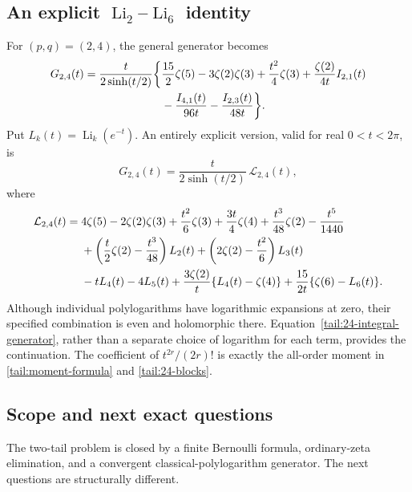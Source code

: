 \subsection{An explicit \texorpdfstring{$\operatorname{Li}_2$--$\operatorname{Li}_6$}{Li2--Li6} identity}

For \((p,q)=(2,4)\), the general generator becomes
\begin{align}\label{tail:24-integral-generator}
 G_{2,4}(t)=\frac{t}{2\sinh(t/2)}\bigg\{
 &\frac{15}{2}\zeta(5)-3\zeta(2)\zeta(3)
       +\frac{t^2}{4}\zeta(3)
       +\frac{\zeta(2)}{4t}I_{2,1}(t)\notag\\
 &-\frac{I_{4,1}(t)}{96t}
       -\frac{I_{2,3}(t)}{48t}\bigg\}.
\end{align}
Put \(L_k(t)=\operatorname{Li}_k(e^{-t})\). An entirely explicit
version, valid for real \(0<t<2\pi\), is
\begin{equation}\label{tail:24-Li-generator}
 G_{2,4}(t)=\frac{t}{2\sinh(t/2)}\,\mathcal L_{2,4}(t),
\end{equation}
where
\begin{align}\label{tail:24-Li-body}
 \mathcal L_{2,4}(t)={}&4\zeta(5)-2\zeta(2)\zeta(3)
       +\frac{t^2}{6}\zeta(3)+\frac{3t}{4}\zeta(4)
       +\frac{t^3}{48}\zeta(2)-\frac{t^5}{1440}\notag\\
 &+\left(\frac{t}{2}\zeta(2)-\frac{t^3}{48}\right)L_2(t)
       +\left(2\zeta(2)-\frac{t^2}{6}\right)L_3(t)\notag\\
 &-tL_4(t)-4L_5(t)
       +\frac{3\zeta(2)}{t}\{L_4(t)-\zeta(4)\}
       +\frac{15}{2t}\{\zeta(6)-L_6(t)\}.
\end{align}
Although individual polylogarithms have logarithmic expansions at
zero, their specified combination is even and holomorphic there.
Equation~\eqref{tail:24-integral-generator}, rather than a separate
choice of logarithm for each term, provides the continuation. The
coefficient of \(t^{2r}/(2r)!\) is exactly the all-order moment in
\eqref{tail:moment-formula} and \eqref{tail:24-blocks}.

\subsection{Scope and next exact questions}

The two-tail problem is closed by a finite Bernoulli formula,
ordinary-zeta elimination, and a convergent classical-polylogarithm
generator. The next questions are structurally different.

